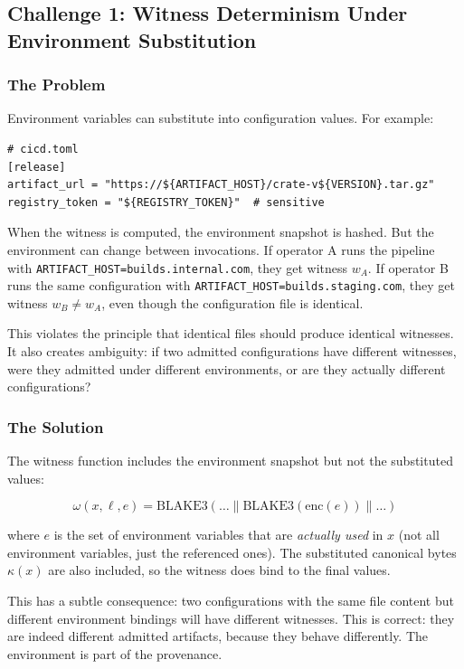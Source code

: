 \subsection{Challenge 1: Witness Determinism Under Environment Substitution}

\subsubsection{The Problem}

Environment variables can substitute into configuration values. For example:

\begin{lstlisting}[caption={Configuration with environment substitution}]
# cicd.toml
[release]
artifact_url = "https://${ARTIFACT_HOST}/crate-v${VERSION}.tar.gz"
registry_token = "${REGISTRY_TOKEN}"  # sensitive
\end{lstlisting}

When the witness is computed, the environment snapshot is hashed. But the environment can change between invocations. If operator A runs the pipeline with \texttt{ARTIFACT\_HOST=builds.internal.com}, they get witness $w_A$. If operator B runs the same configuration with \texttt{ARTIFACT\_HOST=builds.staging.com}, they get witness $w_B \neq w_A$, even though the configuration file is identical.

This violates the principle that identical files should produce identical witnesses. It also creates ambiguity: if two admitted configurations have different witnesses, were they admitted under different environments, or are they actually different configurations?

\subsubsection{The Solution}

The witness function includes the environment snapshot but not the substituted values:

$$\omega(x, \ell, e) = \mathrm{BLAKE3}(\ldots \| \mathrm{BLAKE3}(\mathrm{enc}(e)) \| \ldots)$$

where $e$ is the set of environment variables that are \emph{actually used} in $x$ (not all environment variables, just the referenced ones). The substituted canonical bytes $\kappa(x)$ are also included, so the witness does bind to the final values.

This has a subtle consequence: two configurations with the same file content but different environment bindings will have different witnesses. This is correct: they are indeed different admitted artifacts, because they behave differently. The environment is part of the provenance.

